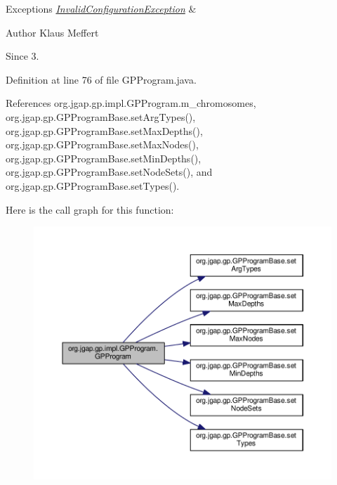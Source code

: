 \begin{DoxyExceptions}{Exceptions}
{\em \hyperlink{classorg_1_1jgap_1_1_invalid_configuration_exception}{Invalid\-Configuration\-Exception}} & \\
\hline
\end{DoxyExceptions}
\begin{DoxyAuthor}{Author}
Klaus Meffert 
\end{DoxyAuthor}
\begin{DoxySince}{Since}
3. 
\end{DoxySince}


Definition at line 76 of file G\-P\-Program.\-java.



References org.\-jgap.\-gp.\-impl.\-G\-P\-Program.\-m\-\_\-chromosomes, org.\-jgap.\-gp.\-G\-P\-Program\-Base.\-set\-Arg\-Types(), org.\-jgap.\-gp.\-G\-P\-Program\-Base.\-set\-Max\-Depths(), org.\-jgap.\-gp.\-G\-P\-Program\-Base.\-set\-Max\-Nodes(), org.\-jgap.\-gp.\-G\-P\-Program\-Base.\-set\-Min\-Depths(), org.\-jgap.\-gp.\-G\-P\-Program\-Base.\-set\-Node\-Sets(), and org.\-jgap.\-gp.\-G\-P\-Program\-Base.\-set\-Types().



Here is the call graph for this function\-:
\nopagebreak
\begin{figure}[H]
\begin{center}
\leavevmode
\includegraphics[width=350pt]{classorg_1_1jgap_1_1gp_1_1impl_1_1_g_p_program_a0c734a54d887f41910bd7dcefca615d6_cgraph}
\end{center}
\end{figure}


